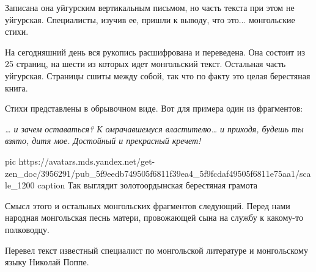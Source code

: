 Записана она уйгурским вертикальным письмом, но часть текста при этом не
уйгурская. Специалисты, изучив ее, пришли к выводу, что это... монгольские
стихи.

На сегодняшний день вся рукопись расшифрована и переведена. Она состоит из 25
страниц, на шести из которых идет монгольский текст. Остальная часть уйгурская.
Страницы сшиты между собой, так что по факту это целая берестяная книга.

Стихи представлены в обрывочном виде. Вот для примера один из фрагментов:

\begin{leftbar}
				\begingroup
\em\color{orange}
\obeycr
… и зачем
оставаться? К омрачавшемуся
властителю… и
приходя, будешь ты взято, дитя
мое. Достойный и прекрасный кречет!
\restorecr
				\endgroup
\end{leftbar}

\ifcmt
  pic https://avatars.mds.yandex.net/get-zen_doc/3956291/pub_5f9eedb749505f6811f39ea4_5f9fcdaf49505f6811e75aa1/scale_1200
  caption Так выглядит золотоордынская берестяная грамота
\fi

Смысл этого и остальных монгольских фрагментов следующий. Перед нами народная
монгольская песнь матери, провожающей сына на службу к какому-то полководцу.

Перевел текст известный специалист по монгольской литературе и монгольскому
языку Николай Поппе.

